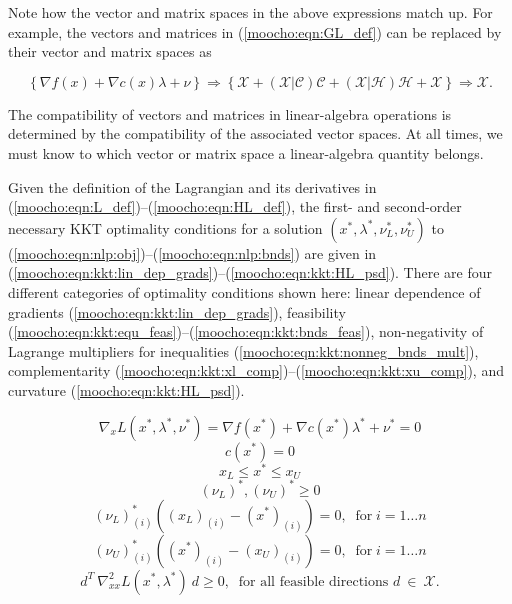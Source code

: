 \documentclass[pdf,ps2pdf,11pt]{SANDreport}
\begin{document}
{Note how the vector and matrix spaces in the above
expressions match up.  For example, the vectors and matrices in
(\ref{moocho:eqn:GL_def}) can be replaced by their vector and matrix
spaces as

\[
 \left\{ \nabla f(x) + \nabla c(x) \lambda + \nu \right\}
\Rightarrow
 \left\{ \mathcal{X} + (\mathcal{X}|\mathcal{C}) \mathcal{C} + (\mathcal{X}|\mathcal{H}) \mathcal{H}
 + \mathcal{X} \right\}
\Rightarrow \mathcal{X}.
\]

The compatibility of vectors and matrices in linear-algebra operations
is determined by the compatibility of the associated vector spaces.
At all times, we must know to which vector or matrix space a
linear-algebra quantity belongs.

Given the definition of the Lagrangian and its derivatives in (\ref{moocho:eqn:L_def})--(\ref{moocho:eqn:HL_def}),
the first- and second-order necessary KKT optimality conditions \cite{ref:nash_sofer_1996} for a
solution $(x^*, \lambda^*, \nu^*_L, \nu^*_U)$ to (\ref{moocho:eqn:nlp:obj})--(\ref{moocho:eqn:nlp:bnds}) are given in
(\ref{moocho:eqn:kkt:lin_dep_grads})--(\ref{moocho:eqn:kkt:HL_psd}).  There are four different categories of optimality
conditions shown here: linear dependence of gradients (\ref{moocho:eqn:kkt:lin_dep_grads}), feasibility
(\ref{moocho:eqn:kkt:equ_feas})--(\ref{moocho:eqn:kkt:bnds_feas}), non-negativity of Lagrange multipliers
for inequalities (\ref{moocho:eqn:kkt:nonneg_bnds_mult}),
complementarity (\ref{moocho:eqn:kkt:xl_comp})--(\ref{moocho:eqn:kkt:xu_comp}), and curvature
(\ref{moocho:eqn:kkt:HL_psd}).

{\bsinglespace
\begin{equation}
\nabla_{x} L(x^*,\lambda^*,\nu^*) = \nabla f(x^*) + \nabla c(x^*) \lambda^* + \nu^* = 0
\label{moocho:eqn:kkt:lin_dep_grads}
\end{equation}
%
\begin{equation}
c(x^*) = 0
\label{moocho:eqn:kkt:equ_feas}
\end{equation}
%
\begin{equation}
x_L \leq x^* \leq x_U
\label{moocho:eqn:kkt:bnds_feas}
\end{equation}
%
\begin{equation}
(\nu_L)^*, (\nu_U)^* \geq 0
\label{moocho:eqn:kkt:nonneg_bnds_mult}
\end{equation}
%
\begin{equation}
(\nu_L)^*_{(i)} ( (x_L)_{(i)} - (x^*)_{(i)} ) = 0, \;\; \mbox{for} \; i = 1 \ldots n
\label{moocho:eqn:kkt:xl_comp}
\end{equation}
%
\begin{equation}
(\nu_U)^*_{(i)} ( (x^*)_{(i)} - (x_U)_{(i)} ) = 0, \;\; \mbox{for} \; i = 1 \ldots n
\label{moocho:eqn:kkt:xu_comp}
\end{equation}
%
\begin{equation}
d^T \: \nabla_{xx}^2 L(x^*,\lambda^*) \: d \geq 0, \;\; \mbox{for all feasible directions $d \:\in\:\mathcal{X}$}.
\label{moocho:eqn:kkt:HL_psd}
\end{equation}
\esinglespace}

}
\end{document}
